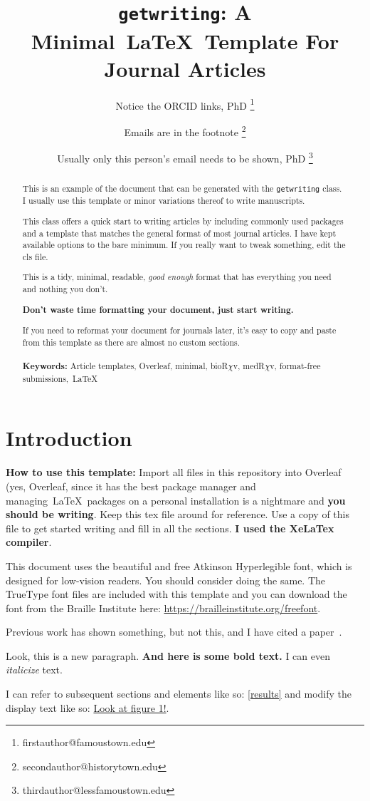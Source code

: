 \documentclass{getwriting}
\title{\lstinline{getwriting}: A Minimal~\LaTeX~Template For Journal Articles}
\author[1,2]{Notice the ORCID links, PhD \orcidlink{xxxx-xxxx-xxxx-xxxx} \thanks{firstauthor@famoustown.edu}}
\author[3]{Emails are in the footnote \orcidlink{xxxx-xxxx-xxxx-xxxx} \thanks{secondauthor@historytown.edu}}
\author[1,3]{Usually only this person's email needs to be shown, PhD \orcidlink{xxxx-xxxx-xxxx-xxxx} \thanks{thirdauthor@lessfamoustown.edu}}
\affil[1]{\footnotesize Department of Science, University of Famoustown}
\affil[2]{\footnotesize Department of Mathematics, University of Lessfamoustown}
\affil[3]{\footnotesize Department of History, University of Historytown}
\begin{document}
\maketitle
\begin{abstract}
    This is an example of the document that can be generated with the \lstinline{getwriting} class. I usually use this template or minor variations thereof to write manuscripts.
    \par
    This class offers a quick start to writing articles by including commonly used packages and a template that matches the general format of most journal articles. I have kept available options to the bare minimum. If you really want to tweak something, edit the cls file. 
    \par
    This is a tidy, minimal, readable, \textit{good enough} format that has everything you need and nothing you don't. 
    \par
    \textbf{Don't waste time formatting your document, just start writing.}
    \par
    If you need to reformat your document for journals later, it's easy to copy and paste from this template as there are almost no custom sections.
    \\\\
    \textbf{Keywords:} Article templates, Overleaf, minimal, bioR$\chi$v, medR$\chi$v, format-free submissions,~\LaTeX
\end{abstract}
\section{Introduction}
\textbf{How to use this template: }Import all files in this repository into Overleaf (yes, Overleaf, since it has the best package manager and managing~\LaTeX~packages on a personal installation is a nightmare and \textbf{you should be writing}. Keep this tex file around for reference. Use a copy of this file to get started writing and fill in all the sections. \textbf{I used the XeLaTex compiler}. 
\par
This document uses the beautiful and free Atkinson Hyperlegible font, which is designed for low-vision readers. You should consider doing the same. The TrueType font files are included with this template and you can download the font from the Braille Institute here: \url{https://brailleinstitute.org/freefont}.
\par
Previous work has shown something, but not this, and I have cited a paper~\cite{scbonita}. 
\par
Look, this is a new paragraph. \textbf{And here is some bold text.} I can even \textit{italicize} text.
\par
I can refer to subsequent sections and elements like so: \hyperref[results]{\autoref{results}} and modify the display text like so: \hyperref[fig:figure1]{Look at figure 1!}.
\par
\end{document}
